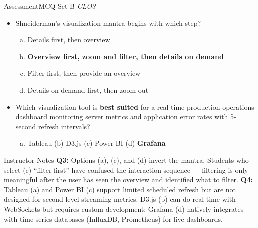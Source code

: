 \documentclass[aspectratio=169,10pt]{beamer}
\begin{document}
\begin{frame}{Assessment\textemdash MCQ Set B \hfill\small\textit{CLO3}}
  \vspace{6pt}
  \begin{itemize}
    \item[\textbf{Q3.}] Shneiderman's visualization mantra begins with which step?
    \begin{enumerate}[(a)]
      \item Details first, then overview
      \item \textbf{Overview first, zoom and filter, then details on demand}
      \item Filter first, then provide an overview
      \item Details on demand first, then zoom out
    \end{enumerate}
  \end{itemize}
  \vspace{8pt}
  \begin{itemize}
    \item[\textbf{Q4.}] Which visualization tool is \textbf{best suited} for a real-time production operations dashboard monitoring server metrics and application error rates with 5-second refresh intervals?
    \begin{enumerate}[(a)]
      \item Tableau \quad (b) D3.js \quad (c) Power BI \quad (d) \textbf{Grafana}
    \end{enumerate}
  \end{itemize}
  \vspace{8pt}
  \begin{alertblock}{Instructor Notes}
    \textbf{Q3:} Options (a), (c), and (d) invert the mantra.  Students who select (c) ``filter first'' have confused the interaction sequence --- filtering is only meaningful after the user has seen the overview and identified what to filter.  \textbf{Q4:} Tableau (a) and Power BI (c) support limited scheduled refresh but are not designed for second-level streaming metrics.  D3.js (b) can do real-time with WebSockets but requires custom development; Grafana (d) natively integrates with time-series databases (InfluxDB, Prometheus) for live dashboards.
  \end{alertblock}
\end{frame}
\end{document}

